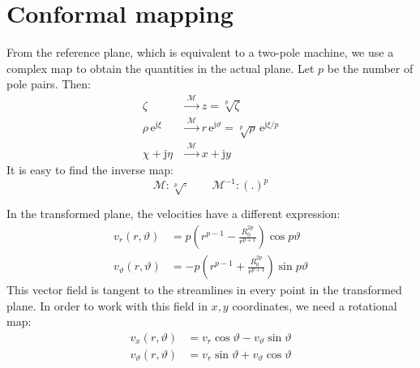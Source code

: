 \documentclass[b5paper,11pt,oneside,fleqn]{article}
\newcommand{\eu}{\mathrm{e}}
\newcommand{\je}{\mathrm{j}}
\newcommand{\te}{\vartheta}
\newcommand{\map}{\mathcal{M}}
\begin{document}
\section{Conformal mapping}
From the reference plane, which is equivalent to a two-pole machine,
we use a complex map to obtain the quantities in the actual plane.
Let $ p $ be the number of pole pairs. Then:
\begin{equation}
\begin{aligned}
\zeta              &\xrightarrow{\;\map\;} z = \sqrt[p]{\zeta} \\
\rho\,\eu^{\je\xi} &\xrightarrow{\;\map\;}
                       r \, \eu^{\je\te} = \sqrt[p]{\rho}\,\eu^{\je 
                       \xi/p} \\
\chi + \je\eta     &\xrightarrow{\;\map\;} x + \je y 
\end{aligned}
\end{equation}
%
It is easy to find the inverse map:
\begin{equation}
\map\colon \sqrt[p]{\cdot} \qquad 
\map^{-1}\colon (.)^p
\end{equation}

In the transformed plane, the velocities have a different expression:
\begin{equation}
\begin{aligned}
v_r(r,\te)  &= 
p \left( r^{p-1} - \frac{R_0^{2p}}{r^{p+1}} \right) \cos p\te \\[1ex]
v_\te(r,\te)  &= 
-p \left( r^{p-1} + \frac{R_0^{2p}}{r^{p+1}} \right) \sin p\te 
\end{aligned}
\end{equation}
%
This vector field is tangent to the streamlines in every point in the 
transformed plane. In order to work with this field in $ x,y $ coordinates, we 
need a rotational map:
\begin{equation}
\begin{aligned}
v_x(r,\te) &= v_r \cos\te - v_\te \sin\te \\
v_\te(r,\te) &= v_r \sin\te + v_\te \cos\te 
\end{aligned}
\end{equation}
\end{document}
